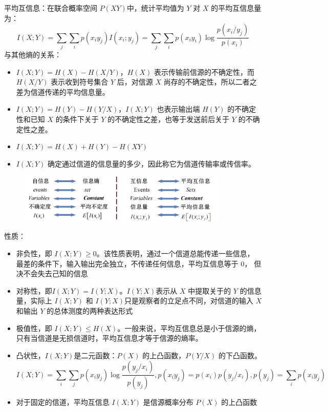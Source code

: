 \begin{remark}
    平均互信息：在联合概率空间 $P(XY)$中，统计平均值为 $Y$ 对 $X$ 的平均互信息量为：\[I(X; Y) = \sum_j\sum_ip(x_iy_j)I(x_i; y_j) = \sum_j\sum_ip(x_iy_i)\log\frac{p(x_i/y_j)}{p(x_i)}\]
    与其他熵的关系：\begin{itemize}
        \item $I(X; Y) = H(X) - H(X / Y)$，$H(X)$ 表示传输前信源的不确定性，而 $H(X/Y)$ 表示收到符号集合 $Y$ 后，对信源 $X$ 尚存的不确定性，所以二者之差为信道传递的平均信息量。
        \item $I(X; Y) = H(Y) - H(Y/X)$，$I(X;Y)$ 也表示输出端 $H(Y)$ 的不确定性和已知 $X$ 的条件下关于 $Y$ 的不确定性之差，也等于发送前后关于 $Y$ 的不确定性之差。
        \item $I(X; Y) = H(X) + H(Y) - H(XY)$
        \item $I(X; Y)$ 确定通过信道的信息量的多少，因此称它为信道传输率或传信率。
    \end{itemize}
    \begin{figure}[htbp]
        \centering
        \includegraphics[width=0.9\textwidth]{./figure/fig1.png}
    \end{figure}
    性质：\begin{itemize}
        \item 非负性，即 $I(X; Y)\ge 0$。该性质表明，通过一个信道总能传递一些信息， 最差的条件下，输入输出完全独立，不传递任何信息，平均互信息等于 $0$， 但决不会失去己知的信息
        \item 对称性，即$I(X; Y)=I(Y; X)$。$I(Y; X)$表示从 $X$ 中提取关于的 $Y$ 的信息量，实际上 $I(X; Y)$ 和 $I(Y; X)$只是观察者的立足点不同，对信道的输入 $X$ 和输出 $Y$ 的总体测度的两种表达形式
        \item 极值性，即 $I(X; Y)\le H(X)$。一般来说，平均互信息总是小于信源的熵，只有当信道是无损信道时，平均互信息才等于信源的熵率。
        \item 凸状性，$I(X; Y)$是二元函数：$P(X)$ 的上凸函数，$P(Y/X)$ 的下凸函数。\[I(X ; Y)=\sum_{i} \sum_{j} p(x_{i} y_{j}) \log \frac{p(y_{j} / x_{i})}{p(y_{j})}, p(x_{i} y_{j})=p(x_{i}) p(y_{j} / x_{i}), p(y_{j})=\sum_{i} p(x_{i} y_{j})\]
        \item 对于固定的信道，平均互信息 $I(X; Y)$ 是信源概率分布 $P(X)$ 的上凸函数

\end{itemize}
\end{remark}

